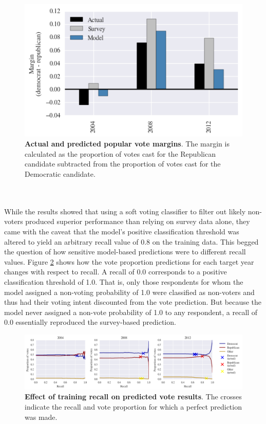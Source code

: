 \documentclass{article}
\begin{document}
	\begin{figure}[h!]
		\begin{center}
			\includegraphics*[width=0.6\linewidth]{margin}
			\caption{\textbf{Actual and predicted popular vote margins}. The margin is calculated as the proportion of votes cast for the Republican candidate subtracted from the proportion of votes cast for the Democratic candidate.}
			\label{fig:margin}
		\end{center}
	\end{figure}
	\hfill \\\\
	While the results showed that using a soft voting classifier to filter out likely non-voters produced superior performance than relying on survey data alone, they came with the caveat that the model's positive classification threshold was altered to yield an arbitrary recall value of 0.8 on the training data. This begged the question of how sensitive model-based predictions were to different recall values. Figure \ref{fig:recall} shows how the vote proportion predictions for each target year changes with respect to recall. A recall of 0.0 corresponds to a positive classification threshold of 1.0. That is, only those respondents for whom the model assigned a non-voting probability of 1.0 were classified as non-voters and thus had their voting intent discounted from the vote prediction. But because the model never assigned a non-vote probability of 1.0 to any respondent, a recall of 0.0 essentially reproduced the survey-based prediction. 
	\begin{figure}[h!]
		\begin{center}
			\includegraphics*[width=1\linewidth]{recall}
			\caption{\textbf{Effect of training recall on predicted vote results}. The crosses indicate the recall and vote proportion for which a perfect prediction was made.}
			\label{fig:recall}
		\end{center}
	\end{figure}
\end{document}
